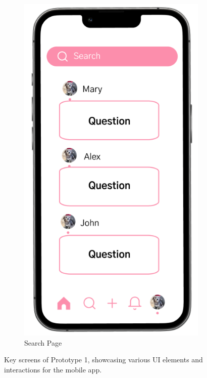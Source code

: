 \begin{figure}[h]
  \hfill
  \begin{subfigure}[b]{0.3\textwidth}
    \includegraphics[width=\textwidth]{Figures/search.png}
    \caption{Search Page}
    \label{fig:search}
  \end{subfigure}
  \label{fig:prototype1_screens_1}
  \caption{Key screens of Prototype 1, showcasing various UI elements and interactions for the mobile app.}
\end{figure}

